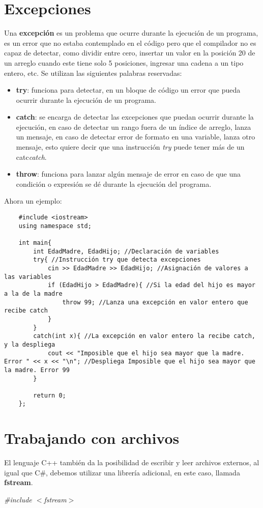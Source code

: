 \section{Excepciones}
\hspace{0.55cm}Una \textbf{excepción} es un problema que ocurre durante la ejecución de un programa, es un error que no estaba contemplado en el código pero que el compilador no es capaz de detectar, como dividir entre cero, insertar un valor en la posición 20 de un arreglo cuando este tiene solo 5 posiciones, ingresar una cadena a un tipo entero, etc. Se utilizan las siguientes palabras reservadas:
\begin{itemize}
    \item \textbf{try}: funciona para detectar, en un bloque de código un error que pueda ocurrir durante la ejecución de un programa.
    \item \textbf{catch}: se encarga de detectar las excepciones que puedan ocurrir durante la ejecución, en caso de detectar un rango fuera de un índice de arreglo, lanza un mensaje, en caso de detectar error de formato en una variable, lanza otro mensaje, esto quiere decir que una instrucción \textit{try} puede tener más de un catc\textit{catch}.
    \item \textbf{throw}: funciona para lanzar algún mensaje de error en caso de que una condición o expresión se dé durante la ejecución del programa.
\end{itemize}

Ahora un ejemplo:
\begin{lstlisting}
    #include <iostream>
    using namespace std;
    
    int main{
        int EdadMadre, EdadHijo; //Declaración de variables
        try{ //Instrucción try que detecta excepciones
            cin >> EdadMadre >> EdadHijo; //Asignación de valores a las variables
            if (EdadHijo > EdadMadre){ //Si la edad del hijo es mayor a la de la madre
                throw 99; //Lanza una excepción en valor entero que recibe catch
            }
        }
        catch(int x){ //La excepción en valor entero la recibe catch, y la despliega
            cout << "Imposible que el hijo sea mayor que la madre. Error " << x << "\n"; //Despliega Imposible que el hijo sea mayor que la madre. Error 99
        }
        
        return 0;
    };
\end{lstlisting}



\section{Trabajando con archivos}
\hspace{0.55cm}El lenguaje C++ también da la posibilidad de escribir y leer archivos externos, al igual que C\#, debemos utilizar una librería adicional, en este caso, llamada \textbf{fstream}.
\begin{center}
    \textit{\#include $<$fstream$>$}
\end{center}

